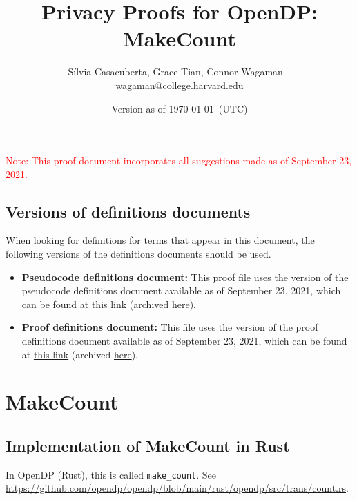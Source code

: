 \documentclass[11pt,letterpaper]{article}
\title{Privacy Proofs for OpenDP: MakeCount}
\author{S\'ilvia Casacuberta, Grace Tian, Connor Wagaman -- wagaman@college.harvard.edu}
\date{Version as of \today~(UTC)}
\newcommand{\inOpenDPRust}[2]{In OpenDP (Rust), this is called \texttt{#1}. See \url{#2}.}
\newcommand{\notebig}[1]{{ \textcolor{red}{{\huge Note:} #1}}}
\theoremstyle{definition}
\begin{document}
\maketitle

\tableofcontents

\notebig{This proof document incorporates all suggestions made as of September 23, 2021.}

\subsection{Versions of definitions documents}
\label{sec:versioned-docs}

When looking for definitions for terms that appear in this document, the following versions of the definitions documents should be used.

\begin{itemize}
    \item \textbf{Pseudocode definitions document:} This proof file uses the version of the pseudocode definitions document available as of September 23, 2021, which can be found at \href{https://github.com/opendp/whitepapers/blob/pseudocode-defns/pseudocode-defns/pseudocode_defns.pdf}{this link} (archived \href{https://web.archive.org/web/20210906201546/https://raw.githubusercontent.com/opendp/whitepapers/pseudocode-defns/pseudocode-defns/pseudocode_defns.pdf}{here}).
    
    \item \textbf{Proof definitions document:} This file uses the version of the proof definitions document available as of September 23, 2021, which can be found at \href{https://github.com/opendp/whitepapers/blob/proof-defns/proof-defns/proof_defns.pdf}{this link} (archived \href{https://web.archive.org/web/20210906201056/https://raw.githubusercontent.com/opendp/whitepapers/proof-defns/proof-defns/proof_defns.pdf}{here}). 
\end{itemize}

\section{MakeCount}

\subsection{Implementation of MakeCount in Rust}
\label{sub:rust-implementation}

\inOpenDPRust{make\_count}{https://github.com/opendp/opendp/blob/main/rust/opendp/src/trans/count.rs}
\end{document}
